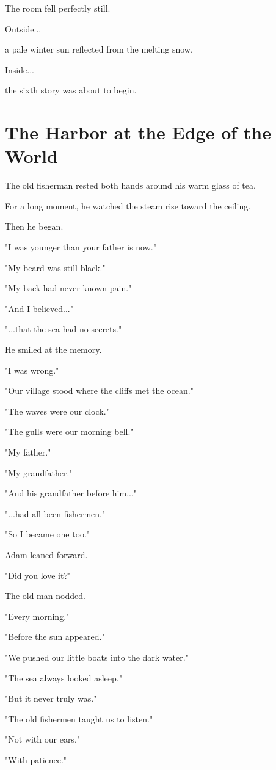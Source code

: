 \documentclass[12pt,openany]{book}
\begin{document}
The room fell perfectly still.

Outside...

a pale winter sun reflected from the melting snow.

Inside...

the sixth story was about to begin.
\section*{The Harbor at the Edge of the World}

The old fisherman rested both hands around his warm glass of tea.

For a long moment, he watched the steam rise toward the ceiling.

Then he began.

"I was younger than your father is now."

"My beard was still black."

"My back had never known pain."

"And I believed..."

"...that the sea had no secrets."

He smiled at the memory.

"I was wrong."

"Our village stood where the cliffs met the ocean."

"The waves were our clock."

"The gulls were our morning bell."

"My father."

"My grandfather."

"And his grandfather before him..."

"...had all been fishermen."

"So I became one too."

Adam leaned forward.

"Did you love it?"

The old man nodded.

"Every morning."

"Before the sun appeared."

"We pushed our little boats into the dark water."

"The sea always looked asleep."

"But it never truly was."

"The old fishermen taught us to listen."

"Not with our ears."

"With patience."
\end{document}
